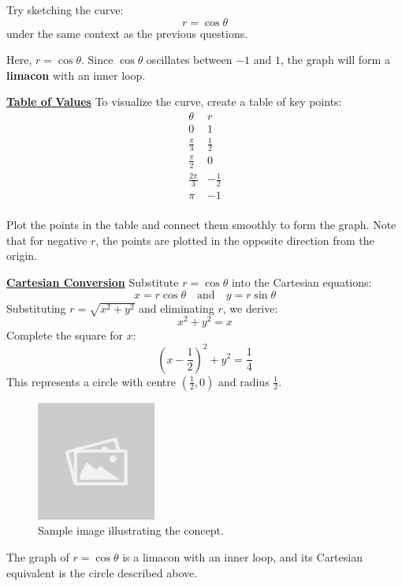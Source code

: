 \documentclass{article}
\begin{document}
\begin{exercisebox}
    Try sketching the curve:
    \[
        r = \cos\theta
    \]
    under the same context as the previous questions.
    
    \begin{solutionbox}
    Here, \( r = \cos\theta \). Since \( \cos\theta \) oscillates between \( -1 \) and \( 1 \), the graph will form a \textbf{limacon} with an inner loop.
    
    \textbf{\underline{Table of Values}}
    To visualize the curve, create a table of key points:
    \[
    \begin{array}{c|c}
    \theta & r \\
    \hline
    0 & 1 \\
    \frac{\pi}{3} & \frac{1}{2} \\
    \frac{\pi}{2} & 0 \\
    \frac{2\pi}{3} & -\frac{1}{2} \\
    \pi & -1 \\
    \end{array}
    \]
    
    \begin{notebox}
        Plot the points in the table and connect them smoothly to form the graph. Note that for negative \( r \), the points are plotted in the opposite direction from the origin.
    \end{notebox}
    
    \textbf{\underline{Cartesian Conversion}}
    Substitute \( r = \cos\theta \) into the Cartesian equations:
    \[
    x = r \cos\theta \quad \text{and} \quad y = r \sin\theta
    \]
    Substituting \( r = \sqrt{x^2 + y^2} \) and eliminating \( r \), we derive:
    \[
    x^2 + y^2 = x
    \]
    Complete the square for \( x \):
    \[
    (x - \frac{1}{2})^2 + y^2 = \frac{1}{4}
    \]
    This represents a circle with centre \( (\frac{1}{2}, 0) \) and radius \( \frac{1}{2} \).
    
    \begin{figure}[H]
        \centering
        \includegraphics[width=0.35\textwidth]{sample_image.jpg}
        \caption{Sample image illustrating the concept.}
        \label{fig:sample_image}
    \end{figure}

    The graph of \( r = \cos\theta \) is a limacon with an inner loop, and its Cartesian equivalent is the circle described above.
    \end{solutionbox}
\end{exercisebox}    
\end{document}
